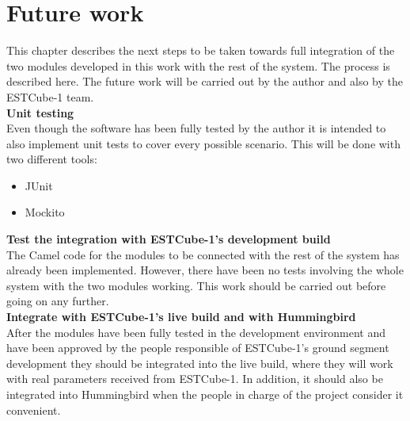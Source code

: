 \chapter{Future work}

This chapter describes the next steps to be taken towards full integration of the two modules developed in this work with the rest of the system. The process is described here. The future work will be carried out by the author and also by the ESTCube-1 team.\\


\textbf{Unit testing}\\
Even though the software has been fully tested by the author it is intended to also implement unit tests to cover every possible scenario. This will be done with two different tools:
\begin{itemize}
\item JUnit\cite{JUnit}
\item Mockito\cite{Mockito}
\end{itemize}
\vspace*{1\baselineskip}


\textbf{Test the integration with ESTCube-1's development build}\\
The Camel code for the modules to be connected with the rest of the system has already been implemented. However, there have been no tests involving the whole system with the two modules working. This work should be carried out before going on any further.\\

\textbf{Integrate with ESTCube-1's live build and with Hummingbird}\\
After the modules have been fully tested in the development environment and have been approved by the people responsible of ESTCube-1's ground segment development they should be integrated into the live build, where they will work with real parameters received from ESTCube-1. In addition, it should also be integrated into Hummingbird when the people in charge of the project consider it convenient.\\




\newpage

